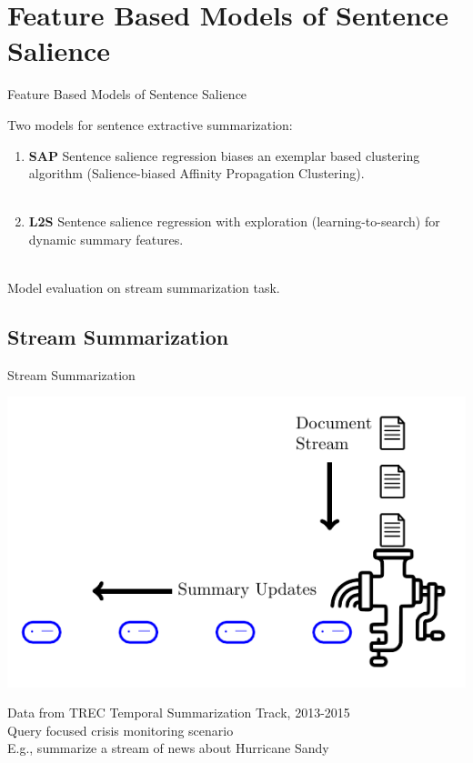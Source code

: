 \section{Feature Based Models of Sentence Salience}

\begin{frame}{Feature Based Models of Sentence Salience}

    Two models for sentence extractive summarization:

    \begin{enumerate}
     \item \textbf{SAP} Sentence salience regression biases an exemplar based
         clustering algorithm (Salience-biased Affinity Propagation Clustering). ~\\~\\
     \item \textbf{L2S} Sentence salience regression with exploration
(learning-to-search)
         for dynamic summary features.
    \end{enumerate}

    ~\\
    Model evaluation on stream summarization task.

\end{frame}

\subsection{Stream Summarization}
\begin{frame}{Stream Summarization}

    {
        \begin{center}
    \includegraphics[scale=.8]{2_feature_based_models_of_salience/image_texs/stream_sum/stream_sum.pdf}
\end{center}
}

Data from TREC Temporal Summarization Track, 2013-2015\\
Query focused crisis monitoring scenario \\
E.g., summarize a stream of news about Hurricane Sandy

\end{frame}

